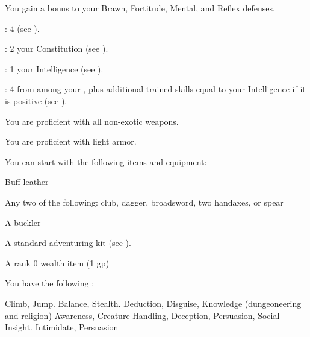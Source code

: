       You gain a  bonus to your Brawn, Fortitude, Mental, and Reflex defenses.

      \begin{raggeditemize}
          \item {}: 4 (see ).
          \item {}: 2 \add your Constitution (see ).
          \item {}: 1 \add your Intelligence (see ).
          \item {}: 4 from among your , plus additional trained skills equal to your Intelligence if it is positive (see ).
      \end{raggeditemize}

      You are proficient with all non-exotic weapons.

      You are proficient with light armor.

    You can start with the following items and equipment:
    \begin{raggeditemize}
        \item Buff leather
        \item Any two of the following: club, dagger, broadsword, two handaxes, or spear
        \item A buckler
        \item A standard adventuring kit (see ).
        \item A rank 0 wealth item (1 gp)
    \end{raggeditemize}

      You have the following :
      \begin{raggeditemize}
         Climb, Jump.
         Balance, Stealth.
         Deduction, Disguise, Knowledge (dungeoneering and religion)
         Awareness, Creature Handling, Deception, Persuasion, Social Insight.
         Intimidate, Persuasion
      \end{raggeditemize}
